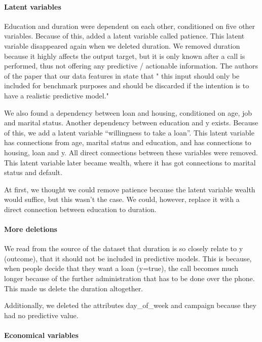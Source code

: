 \documentclass[11pt,]{article}
\let\oldparagraph\paragraph
\renewcommand{\paragraph}[1]{\oldparagraph{#1}\mbox{}}
\begin{document}
\begin{multicols}{2}
\hypertarget{latent-variables}{%
\paragraph{Latent variables}\label{latent-variables}}

Education and duration were dependent on each other, conditioned on five
other variables. Because of this, added a latent variable called
patience. This latent variable disappeared again when we deleted
duration. We removed duration because it highly affects the output
target, but it is only known after a call is performed, thus not
offering any predictive / actionable information. The authors of the
paper that our data features in state that " this input should only be
included for benchmark purposes and should be discarded if the intention
is to have a realistic predictive model."

We also found a dependency between loan and housing, conditioned on age,
job and marital status. Another dependency between education and y
exists. Because of this, we add a latent variable ``willingness to take
a loan''. This latent variable has connections from age, marital status
and education, and has connections to housing, loan and y. All direct
connections between these variables were removed. This latent variable
later became wealth, where it has got connections to marital status and
default.

At first, we thought we could remove patience because the latent
variable wealth would suffice, but this wasn't the case. We could,
however, replace it with a direct connection between education to
duration.

\hypertarget{more-deletions}{%
\paragraph{More deletions}\label{more-deletions}}

We read from the source of the dataset that duration is so closely
relate to y (outcome), that it should not be included in predictive
models. This is because, when people decide that they want a loan
(y=true), the call becomes much longer because of the further
administration that has to be done over the phone. This made us delete
the duration altogether.

Additionally, we deleted the attributes day\_of\_week and campaign
because they had no predictive value.

\hypertarget{economical-variables}{%
\paragraph{Economical variables}\label{economical-variables}}


\end{multicols}
\end{document}
